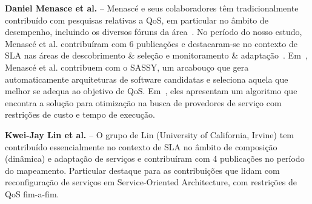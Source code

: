 \textbf{Daniel Menasce et al.} -- Menasc\'{e} e seus colaboradores t\^{e}m tradicionalmente contribu\'{i}do com pesquisas relativas a QoS, em particular no \^{a}mbito de desempenho, incluindo os diversos f\'{o}runs da \'{a}rea~\cite{DBLP:journals/tse/MenasceG00, Menasce:2001:CPW:560806}. No per\'{i}odo do nosso estudo, Menasc\'{e} et al. contribu\'{i}ram com 6 publica\c{c}\~{o}es e destacaram-se no contexto de SLA nas \'{a}reas de descobrimento \& sele\c{c}\~{a}o e monitoramento \& adapta\c{c}\~{a}o~\cite{5696721, DBLP:MenasceCD10, 5552741}. Em~\cite{5696721}, Menasc\'{e} et al. contribuem com o SASSY, um arcabou\c{c}o que gera automaticamente arquiteturas de software candidatas e seleciona aquela que melhor se adequa ao objetivo de QoS. Em~\cite{DBLP:MenasceCD10}, eles apresentam um algoritmo que encontra a solu\c{c}\~{a}o para otimiza\c{c}\~{a}o na busca de provedores de servi\c{c}o com restri\c{c}\~{o}es de custo e tempo de execu\c{c}\~{a}o. 

\textbf{Kwei-Jay Lin et al.} -- O grupo de Lin (University of California, Irvine) tem contribu\'{i}do essencialmente no contexto de SLA no \^{a}mbito de composi\c{c}\~{a}o (din\^{a}mica) e adapta\c{c}\~{a}o de servi\c{c}os e contribu\'{i}ram com 4 publica\c{c}\~{o}es no per\'{i}odo do mapeamento. Particular destaque para  as contribui\c{c}\~{o}es \cite{Lin:2009:EAS:1602932.1603224, Lin:2010:DIS:1861294.1861332, Zhai:2009:SMS:1586636.1586972} que lidam com reconfigura\c{c}\~{a}o de servi\c{c}os em Service-Oriented Architecture, com restri\c{c}\~{o}es de QoS fim-a-fim. 



